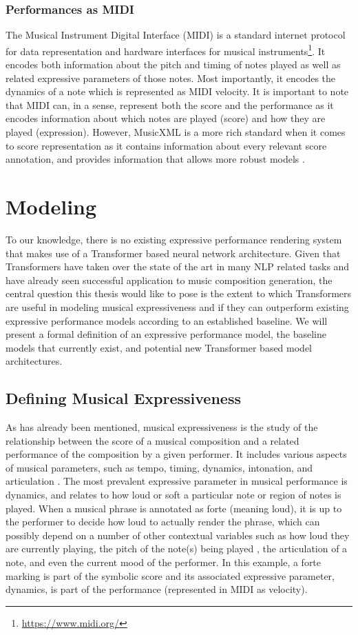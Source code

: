 \documentclass[letterpaper,12pt]{article}
\begin{document}
\subsubsection{Performances as MIDI}
The Musical Instrument Digital Interface (MIDI) is a standard internet protocol for data representation and hardware interfaces for musical instruments\footnote{\url{https://www.midi.org/}}. It encodes both information about the pitch and timing of notes played as well as related expressive parameters of those notes. Most importantly, it encodes the dynamics of a note which is represented as MIDI velocity. It is important to note that MIDI can, in a sense, represent both the score and the performance as it encodes information about which notes are played (score) and how they are played (expression). However, MusicXML is a more rich standard when it comes to score representation as it contains information about every relevant score annotation, and provides information that allows more robust models \cite{grachten2012linear}. 

\section{Modeling}
To our knowledge, there is no existing expressive performance rendering system that makes use of a Transformer based neural network architecture. Given that Transformers have taken over the state of the art in many NLP related tasks and have already seen successful application to music composition generation, the central question this thesis would like to pose is the extent to which Transformers are useful in modeling musical expressiveness and if they can outperform existing expressive performance models according to an established baseline. We will present a formal definition of an expressive performance model, the baseline models that currently exist, and potential new Transformer based model architectures. 

\subsection{Defining Musical Expressiveness}
As has already been mentioned, musical expressiveness is the study of the relationship between the score of a musical composition and a related performance of the composition by a given performer. It includes various aspects of musical parameters, such as tempo, timing, dynamics, intonation, and articulation \cite{cancino2018computational}. The most prevalent expressive parameter in musical performance is dynamics, and relates to how loud or soft a particular note or region of notes is played. When a musical phrase is annotated as forte (meaning loud), it is up to the performer to decide how loud to actually render the phrase, which can possibly depend on a number of other contextual variables such as how loud they are currently playing, the pitch of the note(s) being played \cite{grachten2012linear}, the articulation of a note, and even the current mood of the performer. In this example, a forte marking is part of the symbolic score and its associated expressive parameter, dynamics, is part of the performance (represented in MIDI as velocity). 
\end{document}
